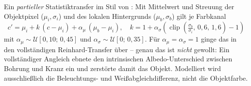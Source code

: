  Ein \emph{partieller} Statistiktransfer im Stil von
\textcite{reinhard2001}: Mit Mittelwert und Streuung der Objektpixel
($\mu_i, \sigma_i$) und des lokalen Hintergrunds ($\mu_b, \sigma_b$) gilt je
Farbkanal
\begin{equation}
c' = \mu_i + k\,(c - \mu_i) + \alpha_\mu\,(\mu_b - \mu_i),
\quad
k = 1 + \alpha_\sigma\!\left(\operatorname{clip}\!\left(
\tfrac{\sigma_b}{\sigma_i},\, 0{,}6,\, 1{,}6\right) - 1\right)
\label{eq:harmonize}
\end{equation}
mit $\alpha_\mu \sim \mathcal{U}[0{,}10;\,0{,}45]$ und
$\alpha_\sigma \sim \mathcal{U}[0;\,0{,}35]$. Für
$\alpha_\mu = \alpha_\sigma = 1$ ginge das in den vollständigen
Reinhard-Transfer über -- genau das ist \emph{nicht} gewollt: Ein vollständiger
Angleich ebnete den intrinsischen Albedo-Unterschied zwischen Bohrung und Kranz
ein und zerstörte damit das Objekt. Modelliert wird ausschließlich die
Beleuchtungs- und Weißabgleichdifferenz, nicht die Objektfarbe.


